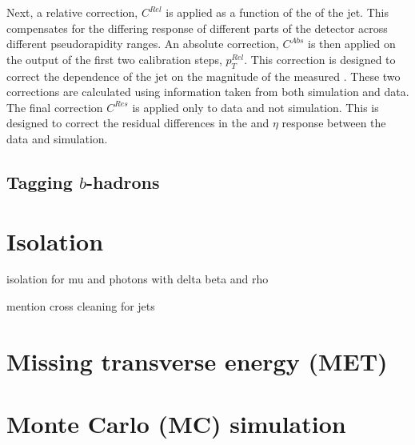 Next, a relative correction, $C^{Rel}$ is applied as a function of the
\eta of the jet. This compensates for the differing response of
different parts of the detector across different pseudorapidity
ranges. An absolute correction, $C^{Abs}$ is then applied on the
output of the first two calibration steps, $p_T^{Rel}$. This
correction is designed to correct the dependence of the jet \pT on the
magnitude of the measured \pT. These two corrections are calculated
using information taken from both simulation and data.%
The final correction $C^{Res}$ is applied only to data and not
simulation. This is designed to correct the residual differences in
the \pT and $\eta$ response between the data and simulation.


\subsection{Tagging $b$-hadrons}

\section{Isolation}

isolation for mu and photons with delta beta and rho

mention cross cleaning for jets

\section{Missing transverse energy (MET)}
\label{sec:met_reco}

\section{Monte Carlo (MC) simulation}
\label{sec:mc_reco}

